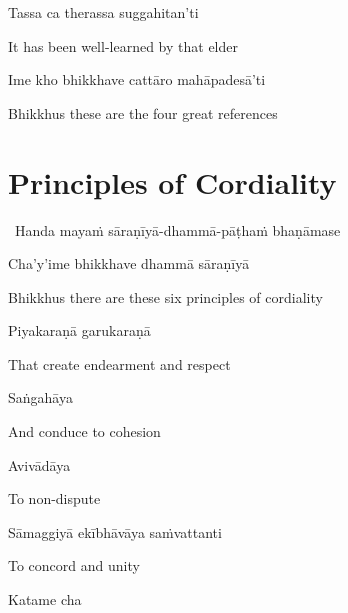 Tassa ca therassa suggahitan'ti

\begin{english}
  It has been well-learned by that elder
\end{english}

Ime kho bhikkhave cattāro mahāpadesā'ti

\begin{english}
  Bhikkhus these are the four great references
\end{english}

\suttaRef{[AN 4.180]}


\section{Principles of Cordiality}
\label{principles-of-cordiality}

\begin{leader}
  \anglebracketleft\ \hspace{-0.5mm}Handa mayaṁ sāraṇīyā-dhammā-pāṭhaṁ bhaṇāmase \hspace{-0.5mm}\anglebracketright\
\end{leader}

Cha'y'ime bhikkhave dhammā sāraṇīyā

\begin{english}
  Bhikkhus there are these six principles of cordiality
\end{english}

Piyakaraṇā garukaraṇā

\begin{english}
  That create endearment and respect
\end{english}

Saṅgahāya

\begin{english}
  And conduce to cohesion
\end{english}

Avivādāya

\begin{english}
  To non-dispute
\end{english}

Sāmaggiyā ekībhāvāya saṁvattanti

\begin{english}
  To concord and unity
\end{english}

Katame cha

